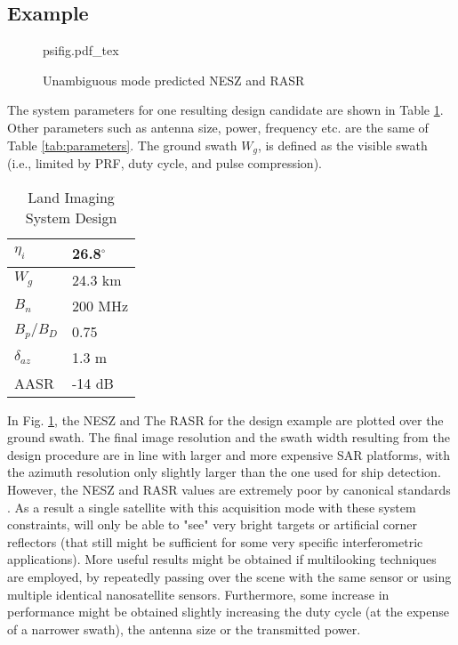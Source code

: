 \documentclass[conference,a4paper]{IEEEtran}
\begin{document}
    \subsection{Example}
    \label{subsec:psiexample}
    \begin{figure}[ht]
        \centering
        \begin{normalsize}
            {psifig.pdf_tex}
        \end{normalsize}
        \caption{Unambiguous mode predicted NESZ and RASR}
        \label{fig:eucap}
    \end{figure}
    The system parameters for one resulting design candidate are shown in Table \ref{tab:psi}.
    Other parameters such as antenna size, power, frequency etc. are the same of Table \ref{tab:parameters}.
    The ground swath $W_g$, is defined as the visible swath (i.e., limited by PRF, duty cycle, and pulse compression).
    \begin{table}[h]
        \caption{Land Imaging System Design}
        \label{tab:psi}
        \centering
        \begin{tabular}{|l|l|}
            \hline
            $\eta_i$      & 26.8$^\circ$ \\ \hline
            $W_g$         & 24.3 km      \\ \hline
            $B_n$         & 200 MHz      \\ \hline
            $B_p/B_D$     & 0.75         \\ \hline
            $\delta_{az}$ & 1.3 m        \\ \hline
            AASR          & -14 dB       \\ \hline
        \end{tabular}
    \end{table}
    In Fig. \ref{fig:eucap}, the NESZ and The RASR for the design example are plotted over the ground swath.
    The final image resolution and the swath width resulting from the design procedure are in line with larger and more expensive SAR platforms, with the azimuth resolution only slightly larger than the one used for ship detection.
    However, the NESZ and RASR values are extremely poor by canonical standards \cite{curlander1991synthetic}.
    As a result a single satellite with this acquisition mode with these system constraints, will only be able to "see" very bright targets or artificial corner reflectors (that still might be sufficient for some very specific interferometric applications).
    More useful results might be obtained if multilooking techniques \cite{curlander1991synthetic,moreira_tutorial} are employed, by repeatedly passing over the scene with the same sensor or using multiple identical nanosatellite sensors.
    Furthermore, some increase in performance might be obtained slightly increasing the duty cycle (at the expense of a narrower swath), the antenna size or the transmitted power.
\end{document}
